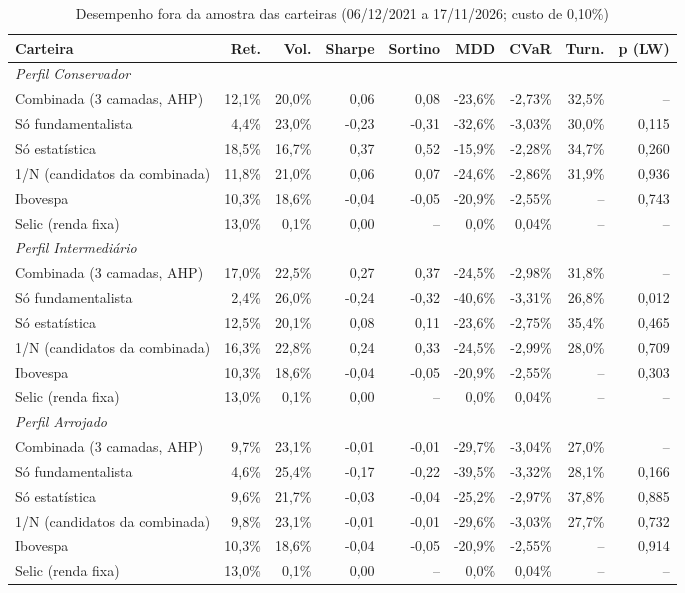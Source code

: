 \begin{table}[htbp]
\centering
\caption{Desempenho fora da amostra das carteiras (06/12/2021 a 17/11/2026; custo de 0,10\%)}
\label{tab:resultado-backtest}
\footnotesize
\begin{tabular}{lrrrrrrrr}
\toprule
\textbf{Carteira} & \textbf{Ret.} & \textbf{Vol.} & \textbf{Sharpe} & \textbf{Sortino} & \textbf{MDD} & \textbf{CVaR} & \textbf{Turn.} & \textbf{p (LW)} \\
\midrule
\multicolumn{9}{l}{\textit{Perfil Conservador}} \\
Combinada (3 camadas, AHP) & 12,1\% & 20,0\% & 0,06 & 0,08 & -23,6\% & -2,73\% & 32,5\% & -- \\
Só fundamentalista & 4,4\% & 23,0\% & -0,23 & -0,31 & -32,6\% & -3,03\% & 30,0\% & 0,115 \\
Só estatística & 18,5\% & 16,7\% & 0,37 & 0,52 & -15,9\% & -2,28\% & 34,7\% & 0,260 \\
1/N (candidatos da combinada) & 11,8\% & 21,0\% & 0,06 & 0,07 & -24,6\% & -2,86\% & 31,9\% & 0,936 \\
Ibovespa & 10,3\% & 18,6\% & -0,04 & -0,05 & -20,9\% & -2,55\% & -- & 0,743 \\
Selic (renda fixa) & 13,0\% & 0,1\% & 0,00 & -- & 0,0\% & 0,04\% & -- & -- \\
\midrule
\multicolumn{9}{l}{\textit{Perfil Intermediário}} \\
Combinada (3 camadas, AHP) & 17,0\% & 22,5\% & 0,27 & 0,37 & -24,5\% & -2,98\% & 31,8\% & -- \\
Só fundamentalista & 2,4\% & 26,0\% & -0,24 & -0,32 & -40,6\% & -3,31\% & 26,8\% & 0,012 \\
Só estatística & 12,5\% & 20,1\% & 0,08 & 0,11 & -23,6\% & -2,75\% & 35,4\% & 0,465 \\
1/N (candidatos da combinada) & 16,3\% & 22,8\% & 0,24 & 0,33 & -24,5\% & -2,99\% & 28,0\% & 0,709 \\
Ibovespa & 10,3\% & 18,6\% & -0,04 & -0,05 & -20,9\% & -2,55\% & -- & 0,303 \\
Selic (renda fixa) & 13,0\% & 0,1\% & 0,00 & -- & 0,0\% & 0,04\% & -- & -- \\
\midrule
\multicolumn{9}{l}{\textit{Perfil Arrojado}} \\
Combinada (3 camadas, AHP) & 9,7\% & 23,1\% & -0,01 & -0,01 & -29,7\% & -3,04\% & 27,0\% & -- \\
Só fundamentalista & 4,6\% & 25,4\% & -0,17 & -0,22 & -39,5\% & -3,32\% & 28,1\% & 0,166 \\
Só estatística & 9,6\% & 21,7\% & -0,03 & -0,04 & -25,2\% & -2,97\% & 37,8\% & 0,885 \\
1/N (candidatos da combinada) & 9,8\% & 23,1\% & -0,01 & -0,01 & -29,6\% & -3,03\% & 27,7\% & 0,732 \\
Ibovespa & 10,3\% & 18,6\% & -0,04 & -0,05 & -20,9\% & -2,55\% & -- & 0,914 \\
Selic (renda fixa) & 13,0\% & 0,1\% & 0,00 & -- & 0,0\% & 0,04\% & -- & -- \\
\bottomrule
\end{tabular}


\end{table}
